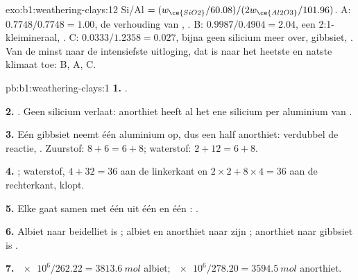 \begin{solution}{exo:b1:weathering-clays:12}
Si/Al $= (w_{\ce{SiO2}}/60.08)/(2w_{\ce{Al2O3}}/101.96)$. A: $0.7748/0.7748 =
1.00$, de verhouding van , . B: $0.9987/0.4904 = 2.04$, een
2:1-kleimineraal, . C: $0.0333/1.2358 = 0.027$, bijna geen silicium meer
over, gibbsiet, . Van de minst naar de intensiefste uitloging, dat is naar het
heetste en natste klimaat toe: B, A, C.
\end{solution}

\begin{solution}{pb:b1:weathering-clays:1}
\textbf{1.} .

\textbf{2.} . Geen silicium
verlaat: anorthiet heeft al het ene silicium per aluminium van .

\textbf{3.} Eén gibbsiet neemt één aluminium op, dus een half anorthiet: verdubbel de reactie,
. Zuurstof:
$8 + 6 = 6 + 8$; waterstof: $2 + 12 = 6 + 8$.

\textbf{4.} ; %
waterstof, $4 + 32 = 36$ aan de linkerkant en $2\times2 + 8\times4 = 36$ aan de
rechterkant, klopt.

\textbf{5.} Elke  gaat samen met één  uit één  en één
:
.

\textbf{6.} Albiet naar beidelliet is ; albiet en anorthiet naar
 zijn ; anorthiet naar gibbsiet is .

\textbf{7.} $\num{e6}/262.22 = \qty{3813.6}{mol}$ albiet;
$\num{e6}/278.20 = \qty{3594.5}{mol}$ anorthiet.


\end{solution}
